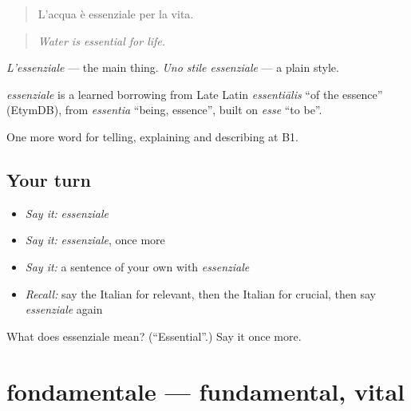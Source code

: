 \begin{quote}
L'acqua è essenziale per la vita.
\end{quote}

\begin{quote}
\emph{Water is essential for life.}
\end{quote}

\emph{L'essenziale} — the main thing. \emph{Uno stile essenziale} — a plain style.

\begin{cousinweb}
\emph{essenziale} is a learned borrowing from Late Latin \emph{essentiālis} \textquotedblleft{}of the essence\textquotedblright{} (EtymDB), from \emph{essentia} \textquotedblleft{}being, essence\textquotedblright{}, built on \emph{esse} \textquotedblleft{}to be\textquotedblright{}.
\end{cousinweb}

\begin{grammarlens}[title={What you've built}]
One more word for telling, explaining and describing at B1.
\end{grammarlens}

\subsection*{Your turn}
\begin{itemize}
\raggedright
  \item \emph{Say it:} \emph{essenziale}
  \item \emph{Say it:} \emph{essenziale}, once more
  \item \emph{Say it:} a sentence of your own with \emph{essenziale}
  \item \emph{Recall:} say the Italian for relevant, then the Italian for crucial, then say \emph{essenziale} again
\end{itemize}

\begin{tcolorbox}[breakable,colback=teal!4,colframe=teal!35!black,title={Before you move on}]
What does essenziale mean? (\textquotedblleft{}Essential\textquotedblright{}.) Say it once more.
\end{tcolorbox}
\section[fondamentale]{fondamentale — fundamental, vital}

\label{lesson:IT-C371-fondamentale}




